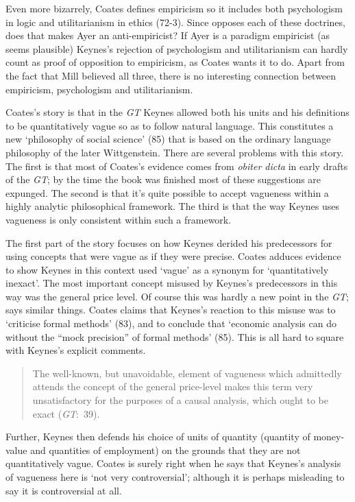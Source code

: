 Even more bizarrely, Coates defines empiricism so it includes both psychologism in logic and utilitarianism in ethics (72-3). Since \citet{Ayer1936} opposes each of these doctrines, does that makes Ayer an anti-empiricist? If Ayer is a paradigm empiricist (as seems plausible) Keynes's rejection of psychologism and utilitarianism can hardly count as proof of opposition to empiricism, as Coates wants it to do. Apart from the fact that Mill believed all three, there is no interesting connection between empiricism, psychologism and utilitarianism.

Coates's story is that in the \textit{GT} Keynes allowed both his units and his definitions to be quantitatively vague so as to follow natural language. This constitutes a new `philosophy of social science' (85) that is based on the ordinary language philosophy of the later Wittgenstein. There are several problems with this story. The first is that most of Coates's evidence comes from \textit{obiter dicta }in early drafts of the \textit{GT}; by the time the book was finished most of these suggestions are expunged. The second is that it's quite possible to accept vagueness within a highly analytic philosophical framework. The third is that the way Keynes uses vagueness is only consistent within such a framework.

The first part of the story focuses on how Keynes derided his predecessors for using concepts that were vague as if they were precise. Coates adduces evidence to show Keynes in this context used `vague' as a synonym for `quantitatively inexact'. The most important concept misused by Keynes's predecessors in this way was the general price level. Of course this was hardly a new point in the \textit{GT}; \citet{Keynes1909} says similar things. Coates claims that Keynes's reaction to this misuse was to `criticise formal methods' (83), and to conclude that `economic analysis can do without the ``mock precision'' of formal methods' (85). This is all hard to square with Keynes's explicit comments.

\begin{quote}
The well-known, but unavoidable, element of vagueness which admittedly attends the concept of the general price-level makes this term very unsatisfactory for the purposes of a causal analysis, which ought to be exact (\textit{GT}:~39).
\end{quote}

\noindent Further, Keynes then defends his choice of units of quantity (quantity of money-value and quantities of employment) on the grounds that they are not quantitatively vague. Coates is surely right when he says that Keynes's analysis of vagueness here is `not very controversial'; although it is perhaps misleading to say it is controversial at all.

